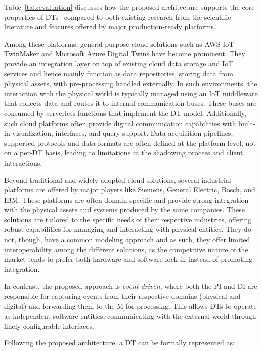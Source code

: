 Table~\ref{tab:evaluation} discusses how the proposed architecture supports the core properties of \acp{DT}~\cite{dt-IoT-context-Minerva-2020} compared to both existing research from the scientific literature and features offered by major production-ready platforms.

Among these platforms, general-purpose cloud solutions such as AWS IoT TwinMaker and Microsoft Azure Digital Twins have become prominent.
They provide an integration layer on top of existing cloud data storage and IoT services and hence mainly function as data repositories, storing data from physical assets, with pre-processing handled externally.
%
In such environments, the interaction with the physical world is typically managed using an IoT middleware that collects data and routes it to internal communication buses.
%
These buses are consumed by serverless functions that implement the \ac{DT} model.
Additionally, such cloud platforms often provide digital communication capabilities with built-in visualization, interfaces, and query support.
%
Data acquisition pipelines, supported protocols and data formats are often defined at the platform level, not on a per-\ac{DT} basis, leading to limitations in the shadowing process and client interactions.

Beyond traditional and widely adopted cloud solutions, several industrial platforms are offered by major players like Siemens, General Electric, Bosch, and IBM.
These platforms are often domain-specific and provide strong integration with the physical assets and systems produced by the same companies.
These solutions are tailored to the specific needs of their respective industries, offering robust capabilities for managing and interacting with physical entities.
They do not, though, have a common modeling approach and as such, they offer limited interoperability among the different solutions, as the competitive nature of the market tends to prefer both hardware and software lock-in instead of promoting integration.

In contrast, the proposed approach is \emph{event-driven}, where both the \ac{PI} and \ac{DI} are responsible for capturing events from their respective domains (physical and digital) and forwarding them to the \ac{M} for processing. This allows \acp{DT} to operate as independent software entities, communicating with the external world through finely configurable interfaces.

Following the proposed architecture, a \ac{DT} can be formally represented as:

